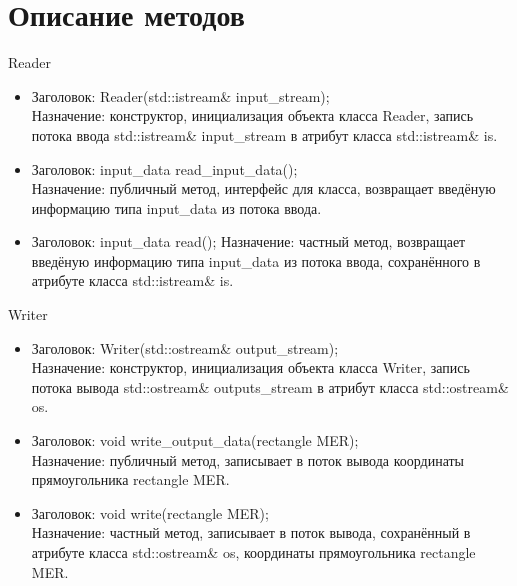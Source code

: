\documentclass[a4paper,12pt]{article}
\begin{document}
{\newpage 

\section{Описание методов} {
\begin{center}
Reader
\end{center}
\begin{itemize}
\item Заголовок: Reader(std::istream\& input\_stream); \\
Назначение: конструктор, инициализация объекта класса Reader, запись потока ввода std::istream\& input\_stream в атрибут класса std::istream\& is.
\item Заголовок: input\_data read\_input\_data(); \\
Назначение: публичный метод, интерфейс для класса, возвращает введёную информацию типа input\_data из потока ввода.
\item Заголовок: input\_data read(); 
Назначение: частный метод, возвращает введёную информацию типа input\_data из потока ввода, сохранённого в атрибуте класса std::istream\& is.
\end{itemize}


\begin{center}
Writer
\end{center}
\begin{itemize}
\item Заголовок: Writer(std::ostream\& output\_stream); \\
Назначение: конструктор, инициализация объекта класса Writer, запись потока вывода std::ostream\& outputs\_stream в атрибут класса std::ostream\& os.
\item Заголовок: void write\_output\_data(rectangle MER); \\
Назначение: публичный метод, записывает в поток вывода координаты прямоугольника rectangle MER.
\item Заголовок: void write(rectangle MER); \\
Назначение: частный метод, записывает в поток вывода, сохранённый в атрибуте класса std::ostream\& os, координаты прямоугольника rectangle MER.
\end{itemize}

}}
\end{document}
